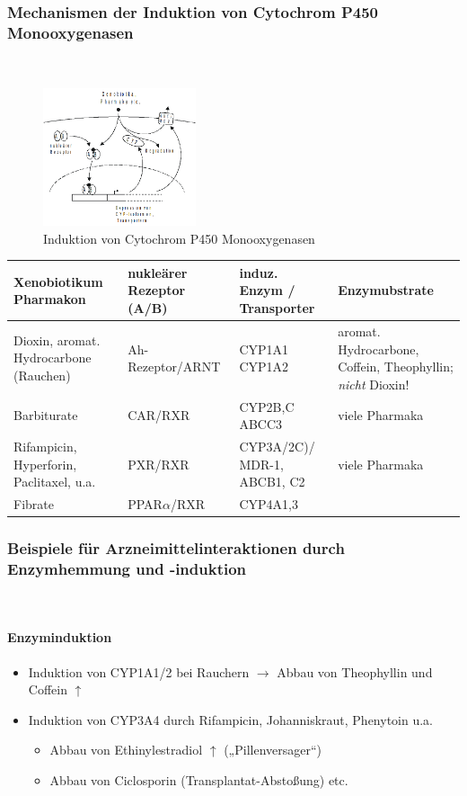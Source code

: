 \documentclass[10pt,a4paper]{report}
\begin{document}
\subsubsection{Mechanismen der Induktion von Cytochrom P450 Monooxygenasen} \mbox{}\\
\begin{figure}[h]
	\centering 
	\includegraphics[width=0.4\textwidth]{CYP2.png} 
	\caption{Induktion von Cytochrom P450 Monooxygenasen} 
	\label{fig:Cytochrom2}
\end{figure}
\begin{tabularx}{\textwidth}{XXXX}
Xenobiotikum Pharmakon& nukleärer Rezeptor (A/B)&induz. Enzym / Transporter&Enzymubstrate\\\hline
Dioxin, aromat. Hydrocarbone (Rauchen)& Ah-Rezeptor/ARNT&CYP1A1 CYP1A2&aromat. Hydrocarbone, Coffein, Theophyllin; \textit{nicht} Dioxin!\\
Barbiturate&CAR/RXR&CYP2B,C ABCC3&viele Pharmaka\\
Rifampicin, Hyperforin, Paclitaxel, u.a.&PXR/RXR&CYP3A/2C)/ MDR-1, ABCB1, C2&viele Pharmaka\\
Fibrate&PPAR$\alpha$/RXR&CYP4A1,3&\\
\end{tabularx}
\subsubsection{Beispiele für Arzneimittelinteraktionen 
durch Enzymhemmung und -induktion} \mbox{}\\
\paragraph{Enzyminduktion}
\begin{itemize}
	\item Induktion von CYP1A1/2 bei Rauchern $\rightarrow$ Abbau von Theophyllin und Coffein $\uparrow$
	\item Induktion von CYP3A4 durch Rifampicin, Johanniskraut, Phenytoin u.a. 
	\begin{itemize}%
  \renewcommand{\labelitemi}{$\rightarrow$}
 \item Abbau von Ethinylestradiol $\uparrow$ („Pillenversager“)
 \item Abbau von Ciclosporin (Transplantat-Abstoßung) etc.
\end{itemize}
\end{itemize}
\end{document}
